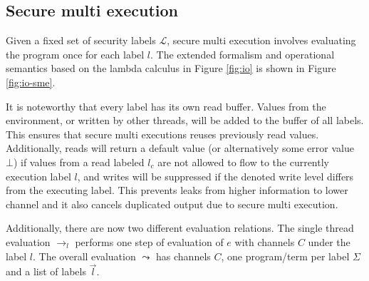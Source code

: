 \documentclass[10pt,preprint]{sigplanconf}
\begin{document}
\subsection{Secure multi execution}

Given a fixed set of security labels $\mathcal{L}$, secure multi execution involves evaluating the program once for each label $l$.  The extended formalism and operational semantics based on the lambda calculus in Figure \ref{fig:io} is shown in Figure \ref{fig:io-sme}.

It is noteworthy that every label has its own read buffer.  Values from the environment, or written by other threads, will be added to the buffer of all labels.  This ensures that secure multi executions reuses previously read values.  Additionally, reads will return a default value (or alternatively some error value $\bot$) if values from a read labeled $l_c$ are not allowed to flow to the currently execution label $l$, and writes will be suppressed if the denoted write level differs from the executing label.  This prevents leaks from higher information to lower channel and it also cancels duplicated output due to secure multi execution.

Additionally, there are now two different evaluation relations.  The single thread evaluation $\rightarrow_l$ performs one step of evaluation of $e$ with channels $C$ under the label $l$.  The overall evaluation $\leadsto$ has channels $C$, one program/term per label $\Sigma$ and a list of labels $\vec{l}$.
\end{document}
